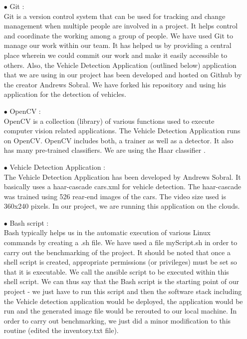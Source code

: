 \documentclass[9pt,twocolumn,twoside]{../../styles/osajnl}
\begin{document}
\begin{itemize}
\item[$\bullet$] Git \cite{Git}: \\
Git is a version control system that can be used for tracking and
change management when multiple people are involved in a project.  It
helps control and coordinate the working among a group of people.  We
have used Git to manage our work within our team.  It has helped us by
providing a central place wherein we could commit our work and make it
easily accessible to others.  Also, the Vehicle Detection Application
(outlined below) application that we are using in our project has been
developed and hosted on Github by the creator Andrews Sobral.  We have
forked his repository and using his application for the detection of
vehicles.

\item[$\bullet$] OpenCV \cite{OpenCV}: \\
OpenCV is a collection (library) of various functions used to execute
computer vision related applications.  The Vehicle Detection
Application runs on OpenCV.  OpenCV includes both, a trainer as well
as a detector.  It also has many pre-trained classifiers.  We are
using the Haar classifier \cite{haar-cascade}.

\item[$\bullet$] Vehicle Detection Application \cite{vehicle-detection-application}: \\
The Vehicle Detection Application has been developed by Andrews
Sobral.  It basically uses a haar-cascade cars.xml for vehicle
detection.  The haar-cascade was trained using 526 rear-end images of
the cars.  The video size used is 360x240 pixels.  In our project, we
are running this application on the clouds.

\item[$\bullet$] Bash script \cite{Bash-script}:\\
Bash typically helps us in the automatic execution of various Linux commands by creating a .sh file.  We have used a file myScript.sh in order to carry out the benchmarking of the project.  It should be noted that once a shell script is created, appropriate permissions (or privileges) must be set so that it is executable.  We call the ansible script to be executed within this shell script.  We can thus say that the Bash script is the starting point of our project - we just have to run this script and then the software stack including the Vehicle detection application would be deployed, the application would be run and the generated image file would be rerouted to our local machine.  In order to carry out benchmarking, we just did a minor modification to this routine (edited the inventory.txt file).

\end{itemize}
\end{document}
